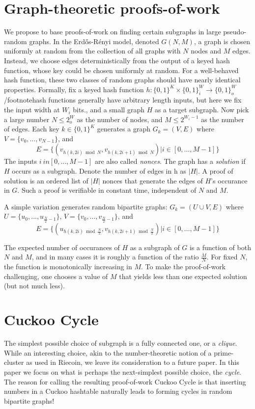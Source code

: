 \documentclass[11pt, oneside]{article}
\begin{document}
\section{Graph-theoretic proofs-of-work}
We propose to base proofs-of-work on finding certain subgraphs in large pseudo-random graphs.
In the Erd\H{o}s-R\'{e}nyi model, denoted $G(N,M)$, a graph is chosen uniformly at random
from the collection of all graphs with $N$ nodes and $M$ edges. Instead, we choose edges
deterministically from the output of a keyed hash function, whose key could be chosen
uniformly at random. For a well-behaved hash function, these two classes of random graphs
should have nearly identical  properties.
Formally, fix a keyed hash function
$h: \{0,1\}^K \times \{0,1\}^W_i \rightarrow \{0,1\}^W_o$/footnote{hash functions generally
have arbitrary length inputs, but here we fix the input width at $W_i$ bits.},
and a small graph $H$ as a target subgraph.
Now pick a large number $N \leq 2^W_o$ as the number of nodes,
and $M \leq 2^{W_i-1}$ as the number of edges.
Each key $k \in \{0,1\}^K$ generates a graph $G_k = (V,E)$ where $V=\{v_0,\ldots,v_{N-1}\}$, and
\begin{equation}
E=\{(v_{h(k,2i) \bmod N},v_{h(k,2i+1) \bmod N}) | i \in [0,\ldots,M-1]\}
\end{equation}
The inputs $i\ in [0,\ldots,M-1]$ are also called {\em nonces}.
The graph has a {\em solution} if $H$ occurs as a subgraph.
Denote the number of edges in h as $|H|$.
A proof of solution is an ordered list of $|H|$ nonces that generate the edges
of $H$'s occurance in $G$.
Such a proof is verifiable in constant time, independent of $N$ and $M$.

A simple variation generates random bipartite graphs:
$G_k = (U \cup V,E)$ where $U=\{u_0,\ldots,u_{\frac{N}{2}-1}\}$, $V=\{v_0,\ldots,v_{\frac{N}{2}-1}\}$,
and
\begin{equation}
E=\{(u_{h(k,2i) \bmod \frac{N}{2}}, v_{h(k,2i+1) \bmod \frac{N}{2}}) | i \in [0,\ldots,M-1]\}
\end{equation}


The expected number of occurances of $H$ as a subgraph of $G$ is a function of both $N$ and $M$,
and in many cases it is roughly a function of the ratio $\frac{M}{N}$.
For fixed $N$, the function is monotonically increasing in $M$.
To make the proof-of-work challenging, one chooses a value of $M$ that yields less than one
expected solution (but not much less).

\section{Cuckoo Cycle}
The simplest possible choice of subgraph is a fully connected one, or a {\em clique}.
While an interesting choice, akin to the number-theoretic notion of a prime-cluster
as used in Riecoin, we leave its consideration to a future paper.
In this paper we focus on what is perhaps the next-simplest possible choice, the {\em cycle}.
The reason for calling the resulting proof-of-work Cuckoo Cycle is that
inserting numbers in a Cuckoo hashtable naturally leads to forming cycles
in random bipartite graphs!
\end{document}
